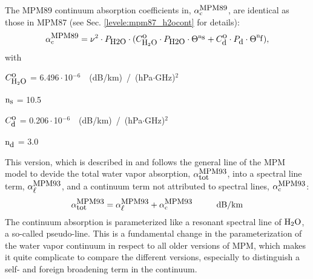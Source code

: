 \label{levele:mpm89_h2ocont}
The MPM89 continuum absorption coefficients in, $\alpha^{\mbox{\rm \small MPM89}}_{\rm c}$, 
are identical as those in MPM87 (see Sec. \ref{levele:mpm87_h2ocont} for 
details):
\begin{equation} 
  \label{eq:mpm89:cont}
  \alpha^{\mbox{\rm \small MPM89}}_{\rm c} = \nu^2 \cdot P_{\mbox{\rm \small H2O}} \cdot 
                (C^{\mbox{\rm o}}_{\mbox{\rm \small H}_{2}\mbox{\rm \small O}} \cdot P_{\mbox{\rm \small H2O}} \cdot \Theta^{{\rm n}_{\mbox{\rm \small s}}} + 
                 C^{\mbox{\rm o}}_{\mbox{\rm \small d}} \cdot P_{\mbox{\rm \small d}}  \cdot \Theta^{{\rm n}_{\mbox{\rm \small f}}}),
\end{equation}
with
\begin{description}
\item{$C^{\mbox{\rm o}}_{\mbox{\rm \small H}_{2}\mbox{\rm \small O}}$}   =  6.496\,$\cdot$\,10$^{-6}$~~(dB/km)~/~(hPa$\cdot$GHz)$^2$
\item{${\rm n}_{\mbox{\rm \small s}}$}    = 10.5
\item{$C^{\mbox{\rm o}}_{\mbox{\rm \small d}}$}   =  0.206\,$\cdot$\,10$^{-6}$~~(dB/km)~/~(hPa$\cdot$GHz)$^2$
\item{${\rm n}_{\mbox{\rm \small d}}$}    =  3.0
\end{description}





\label{leveld:mpm93}
This version, which is described in \cite{liebeetal:93} and 
follows the general line of the MPM model to devide the total 
water vapor absorption, $\alpha^{\mbox{\rm \small MPM93}}_{\mbox{\small tot}}$, into a spectral line 
term, $\alpha^{\mbox{\rm \small MPM93}}_{\mbox{\small $\ell$}}$, and a continuum term not attributed to 
spectral lines, $\alpha^{\mbox{\rm \small MPM93}}_{\rm c}$:
\begin{equation}
  \label{eq:mpm93_abs}
  \alphampmntot = \alphampmnl + \alphampmnc\hspace*{10mm}\mbox{dB/km}
\end{equation}
The continuum absorption is parameterized like a
resonant spectral line of $\mbox{H}_2\mbox{O}$, a so-called pseudo-line. This is a 
fundamental change in the parameterization of the water vapor
continuum in respect to all older versions of MPM, which makes it 
quite complicate to compare the different versions, especially to 
distinguish a self- and foreign broadening term in the continuum.



